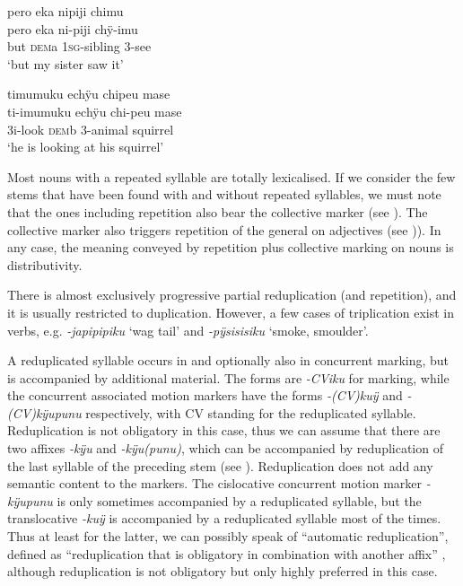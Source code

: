 \ea\label{ex:new23-see}
\begingl
\glpreamble pero eka nipiji chimu\\
\gla pero eka ni-piji chÿ-imu\\
\glb but \textsc{dem}a 1\textsc{sg}-sibling 3-see\\
\glft ‘but my sister saw it’
\endgl
\trailingcitation{[jxx-p120430l-2.047]}
\xe

\ea\label{ex:new23-look}
\begingl
\glpreamble timumuku echÿu chipeu mase\\
\gla ti-imumuku echÿu chi-peu mase\\
\glb 3i-look \textsc{dem}b 3-animal squirrel\\
\glft ‘he is looking at his squirrel’
\endgl
\trailingcitation{[dxx-d120416s.057]}
\xe


Most nouns with a repeated syllable are totally lexicalised. If we consider the few stems that have been found with and without repeated syllables, we must note that the ones including repetition also bear the collective marker (see ). The collective marker also triggers repetition of the general  on adjectives (see )). In any case, the meaning conveyed by repetition plus collective marking on nouns is distributivity.

There is almost exclusively progressive partial reduplication (and repetition), and it is usually restricted to duplication. However, a few cases of triplication exist in verbs, e.g. \textit{-japipipiku} ‘wag tail’ and \textit{-pÿsisisiku} ‘smoke, smoulder’.

A reduplicated syllable occurs in  and optionally also in concurrent  marking, but is accompanied by additional material. The forms are \textit{-CViku} for  marking, while the concurrent associated motion markers have the forms \textit{-(CV)kuÿ} and \textit{-(CV)kÿupunu} respectively, with CV standing for the reduplicated syllable. 
Reduplication is not obligatory in this case, thus we can assume that there are two affixes \textit{-kÿu} and \textit{-kÿu(punu)}, which can be accompanied by reduplication of the last syllable of the preceding stem (see ). Reduplication does not add any semantic content to the markers. The cislocative concurrent motion marker \textit{-kÿupunu} is only sometimes accompanied by a reduplicated syllable, but the  translocative  \textit{-kuÿ} is accompanied by a reduplicated syllable most of the times. Thus at least for the latter, we can possibly speak of “automatic reduplication”, defined as “reduplication that is obligatory in combination with another affix” \citep[18]{Rubino2005}, although reduplication is not obligatory but only highly preferred in this case.

